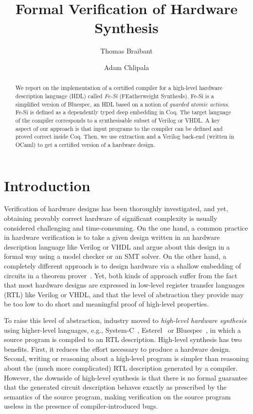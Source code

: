 \documentclass{llncs}
\title{Formal Verification of Hardware Synthesis}
\author{Thomas Braibant\inst{1} \and Adam Chlipala\inst{2}}
\institute{
  Inria Paris-Rocquencourt %
  \and MIT CSAIL %
} %
\begin{document}
\maketitle

\begin{abstract}
  We report on the implementation of a certified compiler for a
  high-level hardware description language (HDL) called \emph{Fe-Si}
  (FEatherweight SynthesIs).
  Fe-Si is a simplified version of Bluespec, an HDL based on a notion
  of \emph{guarded atomic actions}. Fe-Si is defined as a
  dependently typed deep embedding in Coq. The target language of the
  compiler corresponds to a synthesisable subset of Verilog or VHDL.
  A key aspect of our approach is that input programs to the compiler
  can be defined and proved correct inside Coq. Then, we use
  extraction and a Verilog back-end (written in OCaml) to get a
  certified version of a hardware design.
\end{abstract}

\section*{Introduction}
Verification of hardware designs has been thoroughly investigated, and
yet, obtaining provably correct hardware of significant complexity is
usually considered challenging and time-consuming. 
%
On the one hand, a common practice in hardware verification is to take
a given design written in an hardware description language like
Verilog or VHDL and argue about this design in a formal way using a
model checker or an SMT solver.
%
On the other hand, a completely different approach is to design
hardware via a shallow embedding of circuits in a theorem
prover~\cite{hanna-veritas,UCAM-CL-TR-77,hunt89,vamp,certifying-circuits-in-type-theory}.
%
Yet, both kinds of approach suffer from the fact that most hardware
designs are expressed in low-level register transfer languages (RTL)
like Verilog or VHDL, and that the level of abstraction they provide
may be too low to do short and meaningful proof of high-level
properties.

\medskip

To raise this level of abstraction, industry moved to \emph{high-level
  hardware synthesis} using higher-level languages, e.g.,
System-C~\cite{systemc}, Esterel~\cite{DBLP:conf/birthday/Berry00} or
Bluespec~\cite{bluespec}, in which a source program is
compiled to an RTL description.
%
High-level synthesis has two benefits. 
%
First, it reduces the effort necessary to produce a hardware design.
%
Second, writing or reasoning about a high-level program is simpler
than reasoning about the (much more complicated) RTL description
generated by a compiler.
%
However, the downside of high-level synthesis is that there is no
formal guarantee that the generated circuit description behaves
exactly as prescribed by the semantics of the source
program, making verification on the source program useless in the
presence of compiler-introduced bugs.
%
\end{document}
